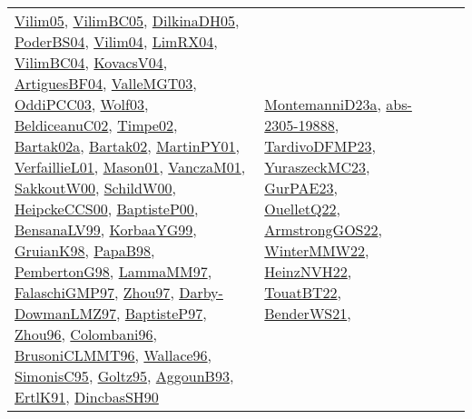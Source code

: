 {\begin{longtable}{lp{3cm}>{\raggedright}p{6cm}>{\raggedright}p{6cm}p{8cm}}
\href{papers/Vilim05.pdf}{Vilim05}\cite{Vilim05}, \href{articles/VilimBC05.pdf}{VilimBC05}\cite{VilimBC05}, \href{papers/DilkinaDH05.pdf}{DilkinaDH05}\cite{DilkinaDH05}, \href{articles/PoderBS04.pdf}{PoderBS04}\cite{PoderBS04}, \href{papers/Vilim04.pdf}{Vilim04}\cite{Vilim04}, \href{papers/LimRX04.pdf}{LimRX04}\cite{LimRX04}, \href{papers/VilimBC04.pdf}{VilimBC04}\cite{VilimBC04}, \href{papers/KovacsV04.pdf}{KovacsV04}\cite{KovacsV04}, \href{papers/ArtiguesBF04.pdf}{ArtiguesBF04}\cite{ArtiguesBF04}, \href{papers/ValleMGT03.pdf}{ValleMGT03}\cite{ValleMGT03}, \href{papers/OddiPCC03.pdf}{OddiPCC03}\cite{OddiPCC03}, \href{papers/Wolf03.pdf}{Wolf03}\cite{Wolf03}, \href{papers/BeldiceanuC02.pdf}{BeldiceanuC02}\cite{BeldiceanuC02}, \href{articles/Timpe02.pdf}{Timpe02}\cite{Timpe02}, \href{papers/Bartak02a.pdf}{Bartak02a}\cite{Bartak02a}, \href{papers/Bartak02.pdf}{Bartak02}\cite{Bartak02}, \href{articles/MartinPY01.pdf}{MartinPY01}\cite{MartinPY01}, \href{papers/VerfaillieL01.pdf}{VerfaillieL01}\cite{VerfaillieL01}, \href{articles/Mason01.pdf}{Mason01}\cite{Mason01}, \href{papers/VanczaM01.pdf}{VanczaM01}\cite{VanczaM01}, \href{articles/SakkoutW00.pdf}{SakkoutW00}\cite{SakkoutW00}, \href{articles/SchildW00.pdf}{SchildW00}\cite{SchildW00}, \href{articles/HeipckeCCS00.pdf}{HeipckeCCS00}\cite{HeipckeCCS00}, \href{articles/BaptisteP00.pdf}{BaptisteP00}\cite{BaptisteP00}, \href{articles/BensanaLV99.pdf}{BensanaLV99}\cite{BensanaLV99}, \href{papers/KorbaaYG99.pdf}{KorbaaYG99}\cite{KorbaaYG99}, \href{papers/GruianK98.pdf}{GruianK98}\cite{GruianK98}, \href{articles/PapaB98.pdf}{PapaB98}\cite{PapaB98}, \href{papers/PembertonG98.pdf}{PembertonG98}\cite{PembertonG98}, \href{articles/LammaMM97.pdf}{LammaMM97}\cite{LammaMM97}, \href{articles/FalaschiGMP97.pdf}{FalaschiGMP97}\cite{FalaschiGMP97}, \href{articles/Zhou97.pdf}{Zhou97}\cite{Zhou97}, \href{articles/Darby-DowmanLMZ97.pdf}{Darby-DowmanLMZ97}\cite{Darby-DowmanLMZ97}, \href{papers/BaptisteP97.pdf}{BaptisteP97}\cite{BaptisteP97}, \href{papers/Zhou96.pdf}{Zhou96}\cite{Zhou96}, \href{papers/Colombani96.pdf}{Colombani96}\cite{Colombani96}, \href{papers/BrusoniCLMMT96.pdf}{BrusoniCLMMT96}\cite{BrusoniCLMMT96}, \href{articles/Wallace96.pdf}{Wallace96}\cite{Wallace96}, \href{papers/SimonisC95.pdf}{SimonisC95}\cite{SimonisC95}, \href{papers/Goltz95.pdf}{Goltz95}\cite{Goltz95}, \href{articles/AggounB93.pdf}{AggounB93}\cite{AggounB93}, \href{papers/ErtlK91.pdf}{ErtlK91}\cite{ErtlK91}, \href{articles/DincbasSH90.pdf}{DincbasSH90}\cite{DincbasSH90} & \href{articles/MontemanniD23a.pdf}{MontemanniD23a}\cite{MontemanniD23a}, \href{articles/abs-2305-19888.pdf}{abs-2305-19888}\cite{abs-2305-19888}, \href{papers/TardivoDFMP23.pdf}{TardivoDFMP23}\cite{TardivoDFMP23}, \href{papers/YuraszeckMC23.pdf}{YuraszeckMC23}\cite{YuraszeckMC23}, \href{articles/GurPAE23.pdf}{GurPAE23}\cite{GurPAE23}, \href{papers/OuelletQ22.pdf}{OuelletQ22}\cite{OuelletQ22}, \href{papers/ArmstrongGOS22.pdf}{ArmstrongGOS22}\cite{ArmstrongGOS22}, \href{papers/WinterMMW22.pdf}{WinterMMW22}\cite{WinterMMW22}, \href{articles/HeinzNVH22.pdf}{HeinzNVH22}\cite{HeinzNVH22}, \href{papers/TouatBT22.pdf}{TouatBT22}\cite{TouatBT22}, \href{papers/BenderWS21.pdf}{BenderWS21}\cite{BenderWS21}, 
\end{longtable}}
